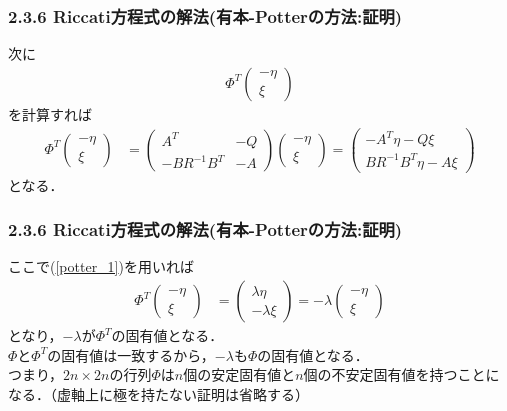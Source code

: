 \begin{frame}[t]
\frametitle{2.3.6 Riccati方程式の解法(有本-Potterの方法:証明)}
次に
\begin{align}
	\Phi^T 
		  \left(\begin{array}{c}
	        - \eta \\
	          \xi
	      \end{array}\right)
\nonumber	
\end{align}
を計算すれば
\begin{align}
	\Phi^T 
		  \left(\begin{array}{c}
	        - \eta \\
	          \xi
	      \end{array}\right)
	&=
	\left(\begin{array}{cc}
	       A^T            &  -Q \\
	       - B R^{-1} B^T & - A
	\end{array}\right)
		  \left(\begin{array}{c}
	        - \eta \\
	          \xi
	      \end{array}\right)
	=
	\left(\begin{array}{c}
	       - A^T \eta  -Q \xi \\
	       B R^{-1} B^T \eta - A \xi
	\end{array}\right)
\end{align}
となる．
\end{frame}

\begin{frame}[t]
\frametitle{2.3.6 Riccati方程式の解法(有本-Potterの方法:証明)}
ここで(\ref{potter_1})を用いれば
\begin{align}
	\Phi^T 
		  \left(\begin{array}{c}
	        - \eta \\
	          \xi
	      \end{array}\right)
	&=
		  \left(\begin{array}{c}
	        \lambda \eta \\
	        - \lambda \xi
	      \end{array}\right)
	= -\lambda
		  \left(\begin{array}{c}
	        -\eta \\
	        \xi
	      \end{array}\right)
\end{align}
となり，$-\lambda$が$\Phi^T$の固有値となる．
\\[3mm]

$\Phi$と$\Phi^T$の固有値は一致するから，$-\lambda$も$\Phi$の固有値となる．
\\[3mm]

つまり，$2n \times 2n$の行列$\Phi$は$n$個の安定固有値と$n$個の不安定固有値を持つことになる．（虚軸上に極を持たない証明は省略する）

\end{frame}

